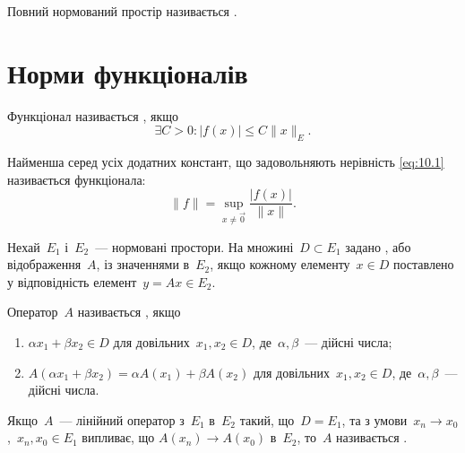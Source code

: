 \begin{definition}
Повний нормований простір називається .
\end{definition}

\section{Норми функціоналів}

\begin{definition}
Функціонал називається , якщо
\begin{equation}
    \label{eq:10.1}    
    \exists C > 0: |f(x)| \le C \|x\|_E.
\end{equation}
\end{definition}

\begin{definition}
Найменша серед усіх додатних констант, що
задовольняють нерівність \eqref{eq:10.1} називається 
функціонала:
\begin{equation*}
    \|f\| = \sup_{x \ne \vec 0} \frac{|f(x)|}{\|x\|}.
\end{equation*}
\end{definition}

\begin{definition}
Нехай~$E_1$ і~$E_2$~--- нормовані простори. На
множині~$D \subset E_1$ задано , або відображення~$A$, із
значеннями в~$E_2$, якщо кожному елементу~$x \in D$
поставлено у відповідність елемент~$y = A x \in E_2$.
\end{definition}

\begin{definition}
Оператор~$A$ називається , якщо
\begin{enumerate}
    \item $\alpha x_1 + \beta x_2 \in D$
    для довільних~$x_1, x_2 \in D$,
    де~$\alpha, \beta$~--- дійсні числа;
    \item $A(\alpha x_1 + \beta x_2) = \alpha A(x_1) + \beta A(x_2)$
    для довільних~$x_1, x_2 \in D$,
    де~$\alpha, \beta$~--- дійсні числа.
\end{enumerate}
\end{definition}

\begin{definition}
Якщо~$A$~--- лінійний оператор з~$E_1$ в~$E_2$ такий,
що~$D = E_1$, та з умови~$x_n \to x_0$,~$x_n, x_0 \in E_1$ випливає, що
$A(x_n) \to A(x_0)$ в~$E_2$, то~$A$ називається .
\end{definition}

